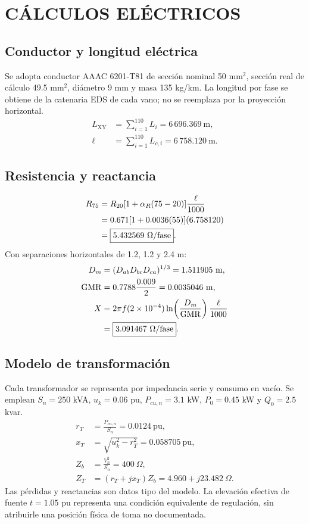 \chapter{CÁLCULOS ELÉCTRICOS}
\section{Conductor y longitud eléctrica}
Se adopta conductor AAAC 6201-T81 de sección nominal 50 mm$^2$, sección real de cálculo 49.5 mm$^2$, diámetro 9 mm y masa 135 kg/km. La longitud por fase se obtiene de la catenaria EDS de cada vano; no se reemplaza por la proyección horizontal.
\begin{align}
L_{\mathrm{XY}}&=\sum_{i=1}^{110}L_i=6\,696.369\ \mathrm{m},\\
\ell&=\sum_{i=1}^{110}L_{c,i}=6\,758.120\ \mathrm{m}.
\end{align}
\section{Resistencia y reactancia}
\begin{align}
R_{75}&=R_{20}[1+\alpha_R(75-20)]\frac{\ell}{1000}\\
&=0.671[1+0.0036(55)](6.758120)\notag\\
&=\boxed{5.432569\ \Omega/\mathrm{fase}}.\notag
\end{align}
Con separaciones horizontales de 1.2, 1.2 y 2.4 m:
\begin{align}
D_m&=(D_{ab}D_{bc}D_{ca})^{1/3}=1.511905\ \mathrm{m},\\
\mathrm{GMR}&=0.7788\frac{0.009}{2}=0.0035046\ \mathrm{m},\\
X&=2\pi f(2\times10^{-4})\ln\!\left(\frac{D_m}{\mathrm{GMR}}\right)\frac{\ell}{1000}\\
&=\boxed{3.091467\ \Omega/\mathrm{fase}}.\notag
\end{align}
\section{Modelo de transformación}
Cada transformador se representa por impedancia serie y consumo en vacío. Se emplean $S_n=250$ kVA, $u_k=0.06$ pu, $P_{cu,n}=3.1$ kW, $P_0=0.45$ kW y $Q_0=2.5$ kvar.
\begin{align}
r_T&=\frac{P_{cu,n}}{S_n}=0.0124\ \mathrm{pu},\\
x_T&=\sqrt{u_k^2-r_T^2}=0.058705\ \mathrm{pu},\\
Z_b&=\frac{V_n^2}{S_n}=400\ \Omega,\\
Z_T&=(r_T+jx_T)Z_b=4.960+j23.482\ \Omega.
\end{align}
Las pérdidas y reactancias son datos tipo del modelo. La elevación efectiva de fuente $t=1.05$ pu representa una condición equivalente de regulación, sin atribuirle una posición física de toma no documentada.
